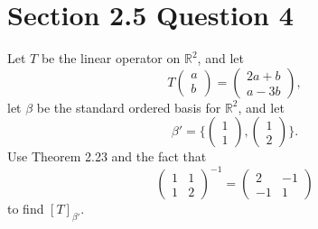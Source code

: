 \documentclass[13pt]{article}
\begin{document}
        \newpage
        \section*{Section 2.5 Question 4}
        Let $T$ be the linear operator on $\mathbb{R}^2$, and let
        \[T
          \begin{pmatrix}
            a \\
            b
          \end{pmatrix}
          =
          \begin{pmatrix}
            2a + b \\
            a - 3b
          \end{pmatrix},\]
        let $\beta$ be the standard ordered basis for $\mathbb{R}^2$, and let
        \[\beta' = \bigg\{
          \begin{pmatrix}
            1 \\
            1
          \end{pmatrix},
          \begin{pmatrix}
            1 \\
            2
          \end{pmatrix} \bigg\}.\]
        Use Theorem 2.23 and the fact that
        \[
          \begin{pmatrix}
            1 & 1 \\
            1 & 2
          \end{pmatrix}^{-1}
          =
          \begin{pmatrix}
            2 & -1 \\
            -1 & 1
          \end{pmatrix}\]
        to find $[T]_{\beta'}$.
\end{document}
